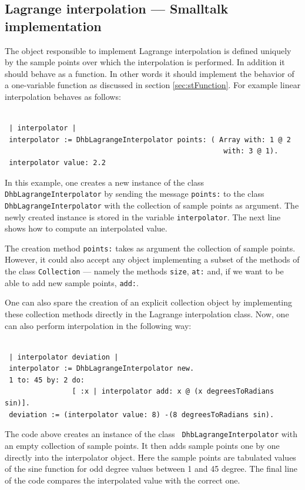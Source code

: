 \documentclass[twoside]{book}
\begin{document}
\subsection{Lagrange interpolation --- Smalltalk implementation}
\label{sec:slagrange} The object
responsible to implement Lagrange interpolation is defined
uniquely by the sample points over which the interpolation is
performed. In addition it should behave as a function. In other
words it should implement the behavior of a one-variable function
as discussed in section \ref{sec:stFunction}. For example linear
interpolation behaves as follows:
\begin{codeExample}\label{ex:lagrangeS1}
\begin{verbatim}

 | interpolator |
 interpolator := DhbLagrangeInterpolator points: ( Array with: 1 @ 2
                                                    with: 3 @ 1).
 interpolator value: 2.2
\end{verbatim}
\end{codeExample}
In this example, one creates a new instance of the class {\tt
DhbLagrangeInterpolator} by sending the message {\tt points:} to
the class {\tt DhbLagrangeInterpolator} with the collection of
sample points as argument. The newly created instance is stored in
the variable {\tt interpolator}. The next line shows how to
compute an interpolated value.

The creation method {\tt points:} takes as argument the collection
of sample points. However, it could also accept any object
implementing a subset of the methods of the class {\tt Collection}
--- namely the methods {\tt size}, {\tt at:} and, if we want to be
able to add new sample points, {\tt add:}.

One can also spare the creation of an explicit collection object
by implementing these collection methods directly in the Lagrange
interpolation class. Now, one can also perform interpolation in
the following way:
\begin{codeExample}\label{ex:lagrangeS2}
\begin{verbatim}

 | interpolator deviation |
 interpolator := DhbLagrangeInterpolator new.
 1 to: 45 by: 2 do:
                [ :x | interpolator add: x @ (x degreesToRadians sin)].
 deviation := (interpolator value: 8) -(8 degreesToRadians sin).
\end{verbatim}
\end{codeExample}
The code above creates an instance of the class {\tt
DhbLagrangeInterpolator} with an empty collection of sample
points. It then adds sample points one by one directly into the
interpolator object. Here the sample points are tabulated values
of the sine function for odd degree values between 1 and 45
degree. The final line of the code compares the interpolated value
with the correct one.
\end{document}
